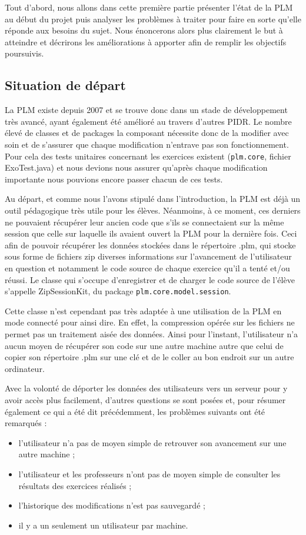 Tout d'abord, nous allons dans cette première partie présenter l'état de la PLM au début du projet puis analyser les problèmes à traiter pour faire en sorte qu'elle réponde aux besoins du sujet. Nous énoncerons alors plus clairement le but à atteindre et décrirons les améliorations à apporter afin de remplir les objectifs poursuivis.

\subsection{Situation de départ}

La PLM existe depuis 2007 et se trouve donc dans un stade de développement très avancé, ayant également été amélioré au travers d'autres PIDR. Le nombre élevé de classes et de packages la composant nécessite donc de la modifier avec soin et de s'assurer que chaque modification n'entrave pas son fonctionnement. Pour cela des tests unitaires concernant les exercices existent (\texttt{plm.core}, fichier ExoTest.java) et nous devions nous assurer qu'après chaque modification importante nous pouvions encore passer chacun de ces tests.


Au départ, et comme nous l'avons stipulé dans l'introduction, la PLM est déjà un outil pédagogique très utile pour les élèves. Néanmoins, à ce moment, ces derniers ne pouvaient récupérer leur ancien code que s'ils se connectaient sur la même session que celle sur laquelle ils avaient ouvert la PLM pour la dernière fois. Ceci afin de pouvoir récupérer les données stockées dans le répertoire .plm, qui stocke sous forme de fichiers zip diverses informations sur l'avancement de l'utilisateur en question et notamment le code source de chaque exercice qu'il a tenté et/ou réussi. Le classe qui s'occupe d'enregistrer et de charger le code source de l'élève s'appelle ZipSessionKit, du package \texttt{plm.core.model.session}.


Cette classe n'est cependant pas très adaptée à une utilisation de la PLM en mode \og connecté\fg{} pour ainsi dire. En effet, la compression opérée sur les fichiers ne permet pas un traitement aisée des données. Ainsi pour l'instant, l'utilisateur n'a aucun moyen de récupérer son code sur une autre machine autre que celui de copier son répertoire .plm sur une clé et de le coller au bon endroit sur un autre ordinateur.


Avec la volonté de déporter les données des utilisateurs vers un serveur pour y avoir accès plus facilement, d'autres questions se sont posées et, pour résumer également ce qui a été dit précédemment, les problèmes suivants ont été remarqués :
\begin{itemize}
\item l'utilisateur n'a pas de moyen simple de retrouver son avancement sur une autre machine ;
\item l'utilisateur et les professeurs n'ont pas de moyen simple de consulter les résultats des exercices réalisés ;
\item l'historique des modifications n'est pas sauvegardé ;
\item il y a un seulement un utilisateur par machine.
\end{itemize}

